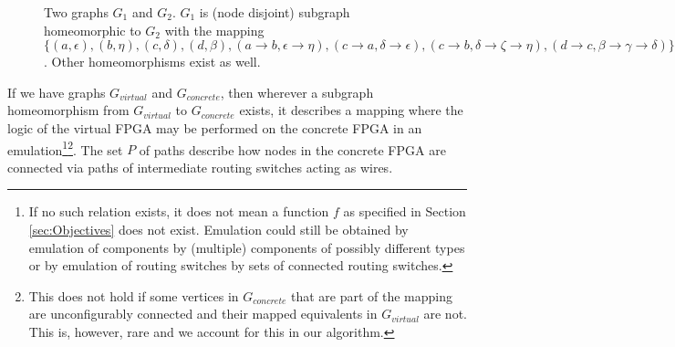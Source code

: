 \begin{figure}
\centering
\parbox{1.2in}{

}
\qquad\qquad
\begin{minipage}{1.2in}%

\end{minipage}
\caption{Two graphs $G_1$ and $G_2$. $G_1$ is (node disjoint) subgraph homeomorphic to $G_2$ with the mapping $\{(a, \epsilon), (b, \eta), (c, \delta), (d, \beta), (a \to b, \epsilon \to \eta), (c \to a, \delta \to \epsilon), (c \to b, \delta \to \zeta \to \eta), (d \to c, \beta \to \gamma \to \delta)\}$. Other homeomorphisms exist as well.}
\end{figure}

If we have graphs $G_{virtual}$ and $G_{concrete}$, then wherever a subgraph homeomorphism from $G_{virtual}$ to $G_{concrete}$ exists, it describes a mapping where the logic of the virtual FPGA may be performed on the concrete FPGA in an emulation\footnote{If no such relation exists, it does not mean a function $f$ as specified in Section \ref{sec:Objectives} does not exist. Emulation could still be obtained by emulation of components by (multiple) components of possibly different types or by emulation of routing switches by sets of connected routing switches.}\footnote{This does not hold if some vertices in $G_{concrete}$ that are part of the mapping are unconfigurably connected and their mapped equivalents in $G_{virtual}$ are not. This is, however, rare and we account for this in our algorithm.}. The set $P$ of paths describe how nodes in the concrete FPGA are connected via paths of intermediate routing switches acting as wires.

